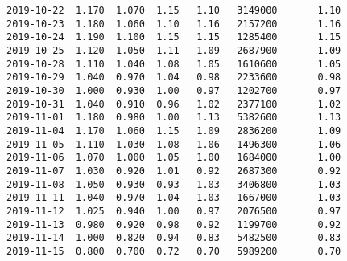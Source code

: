 \documentclass[11pt]{article}
\begin{document}
\begin{Verbatim}[commandchars=\\\{\}]
2019-10-22  1.170  1.070  1.15   1.10   3149000       1.10
2019-10-23  1.180  1.060  1.10   1.16   2157200       1.16
2019-10-24  1.190  1.100  1.15   1.15   1285400       1.15
2019-10-25  1.120  1.050  1.11   1.09   2687900       1.09
2019-10-28  1.110  1.040  1.08   1.05   1610600       1.05
2019-10-29  1.040  0.970  1.04   0.98   2233600       0.98
2019-10-30  1.000  0.930  1.00   0.97   1202700       0.97
2019-10-31  1.040  0.910  0.96   1.02   2377100       1.02
2019-11-01  1.180  0.980  1.00   1.13   5382600       1.13
2019-11-04  1.170  1.060  1.15   1.09   2836200       1.09
2019-11-05  1.110  1.030  1.08   1.06   1496300       1.06
2019-11-06  1.070  1.000  1.05   1.00   1684000       1.00
2019-11-07  1.030  0.920  1.01   0.92   2687300       0.92
2019-11-08  1.050  0.930  0.93   1.03   3406800       1.03
2019-11-11  1.040  0.970  1.04   1.03   1667000       1.03
2019-11-12  1.025  0.940  1.00   0.97   2076500       0.97
2019-11-13  0.980  0.920  0.98   0.92   1199700       0.92
2019-11-14  1.000  0.820  0.94   0.83   5482500       0.83
2019-11-15  0.800  0.700  0.72   0.70   5989200       0.70


\end{Verbatim}
\end{document}
